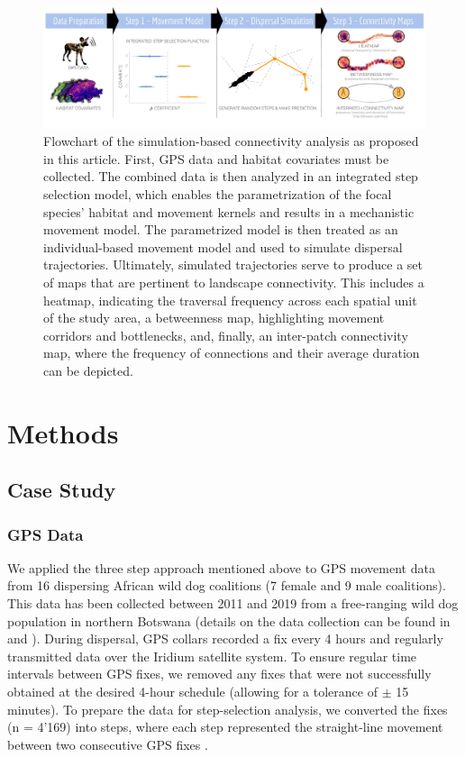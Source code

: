 \documentclass[abstract=on,10pt,a4paper,bibliography=totocnumbered]{article}
\begin{document}
\begin{figure}[htbp]
  \begin{center}
    \includegraphics[width = \textwidth]{99_GraphicalAbstract2.pdf}
    \caption{Flowchart of the simulation-based connectivity analysis as proposed
    in this article. First, GPS data and habitat covariates must be
    collected. The combined data is then analyzed in an integrated step
    selection model, which enables the parametrization of the focal species'
    habitat and movement kernels and results in a mechanistic movement model.
    The parametrized model is then treated as an individual-based movement model
    and used to simulate dispersal trajectories. Ultimately, simulated
    trajectories serve to produce a set of maps that are pertinent to landscape
    connectivity. This includes a heatmap, indicating the traversal frequency
    across each spatial unit of the study area, a betweenness map, highlighting
    movement corridors and bottlenecks, and, finally, an inter-patch
    connectivity map, where the frequency of connections and their average
    duration can be depicted.}
    \label{GraphicalAbstract}
  \end{center}
\end{figure}

\section{Methods}
\subsection{Case Study}
\subsubsection{GPS Data}
We applied the three step approach mentioned above to GPS movement data from 16
dispersing African wild dog coalitions (7 female and 9 male coalitions). This
data has been collected between 2011 and 2019 from a free-ranging wild dog
population in northern Botswana (details on the data collection can be found in
\cite{Cozzi.2020} and \cite{Hofmann.2021}). During dispersal, GPS collars
recorded a fix every 4 hours and regularly transmitted data over the Iridium
satellite system. To ensure regular time intervals between GPS fixes, we removed
any fixes that were not successfully obtained at the desired 4-hour schedule
(allowing for a tolerance of \( \pm \) 15 minutes). To prepare the data for
step-selection analysis, we converted the fixes (n = 4'169) into steps, where
each step represented the straight-line movement between two consecutive GPS
fixes \citep{Turchin.1998}.
\end{document}
